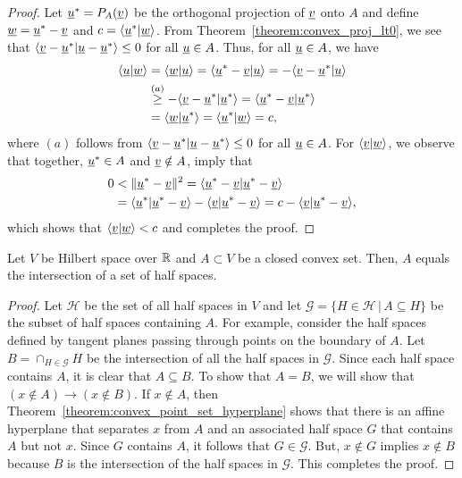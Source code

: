 \begin{proof}
Let $\underline{u}^* = P_A (\underline{v})$ be the orthogonal projection of $\underline{v}$ onto $A$ and define $\underline{w} = \underline{u}^* - \underline{v}$ and $c= \langle \underline{u}^* | \underline{w} \rangle$.
From Theorem~\ref{theorem:convex_proj_lt0}, we see that $\langle \underline{v}-\underline{u}^* | \underline{u}-\underline{u}^* \rangle \leq 0$ for all $\underline{u} \in A$.
Thus, for all $\underline{u}\in A$, we have
\begin{align*}
\langle \underline{u} | \underline{w} \rangle
&= \langle \underline{w} | \underline{u} \rangle
= \langle \underline{u}^* - \underline{v} | \underline{u} \rangle
= - \langle \underline{v} - \underline{u}^* | \underline{u} \rangle \\
&\stackrel{(a)}{\geq} - \langle \underline{v} - \underline{u}^* | \underline{u}^* \rangle
= \langle \underline{u}^* - \underline{v} | \underline{u}^* \rangle
\\
&= \langle \underline{w} | \underline{u}^* \rangle
= \langle \underline{u}^* | \underline{w} \rangle
= c,
\end{align*}
where $(a)$ follows from $\langle \underline{v}-\underline{u}^* | \underline{u}-\underline{u}^* \rangle \leq 0$ for all $\underline{u} \in A$.
For $\langle \underline{v} | \underline{w} \rangle$, we observe that together, $\underline{u}^* \in A$ and $\underline{v} \notin A$, imply that
\begin{align*}
0 &< \| \underline{u}^* - \underline{v} \|^2
= \langle \underline{u}^* - \underline{v} | \underline{u}^* - \underline{v} \rangle \\
&= \langle \underline{u}^* | \underline{u}^* - \underline{v} \rangle - \langle  \underline{v} | \underline{u}^* - \underline{v} \rangle
= c - \langle  \underline{v} | \underline{u}^* - \underline{v} \rangle,
\end{align*}
which shows that $\langle \underline{v} | \underline{w} \rangle < c$ and completes the proof.
\end{proof}

\begin{theorem}
Let $V$ be Hilbert space over $\mathbb{R}$ and $A \subset V$ be a closed convex set.
Then, $A$ equals the intersection of a set of half spaces.
\end{theorem}

\begin{proof}
Let $\mathcal{H}$ be the set of all half spaces in $V$ and let $\mathcal{G} = \{ H\in \mathcal{H} \,|\, A \subseteq H \}$  be the subset of half spaces containing $A$.
For example, consider the half spaces defined by tangent planes passing through points on the boundary of $A$.
Let $B= \cap_{H\in \mathcal{G}} H$ be the intersection of all the half spaces in $\mathcal{G}$.
Since each half space contains $A$, it is clear that $A\subseteq B$.
To show that $A = B$, we will show that $(x\notin A) \to (x\notin B)$.
If $x \notin A$, then Theorem~\ref{theorem:convex_point_set_hyperplane} shows that there is an affine hyperplane that separates $x$ from $A$ and an associated half space $G$ that contains $A$ but not $x$.
Since $G$ contains $A$, it follows that $G \in \mathcal{G}$.
But, $x \notin G$ implies $x \notin B$ because $B$ is the intersection of the half spaces in $\mathcal{G}$. 
This completes the proof.
\end{proof}

